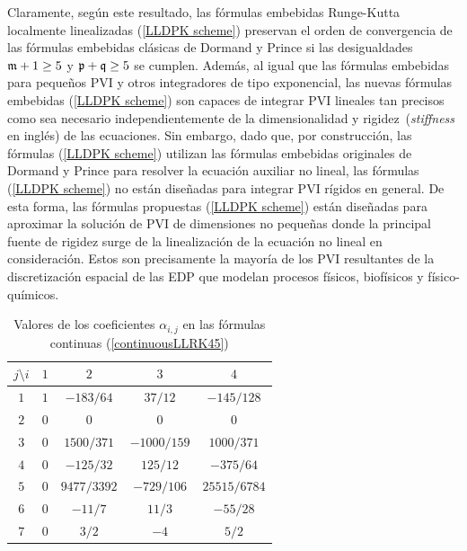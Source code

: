 Claramente, según este resultado, las fórmulas embebidas Runge-Kutta localmente linealizadas (\ref{LLDPK scheme}) preservan el orden de convergencia de las fórmulas embebidas clásicas de Dormand y Prince si las desigualdades $\mathfrak{m}+1 \ge 5 $ y $\mathfrak{p}+\mathfrak{q} \ge 5$ se cumplen. Además, al igual que las fórmulas embebidas para pequeños PVI y otros integradores de tipo exponencial, las nuevas fórmulas embebidas (\ref{LLDPK scheme}) son capaces de integrar PVI lineales tan precisos como sea necesario independientemente de la dimensionalidad y rigidez~(\textit{stiffness} en inglés) de las ecuaciones. Sin embargo, dado que, por construcción, las fórmulas (\ref{LLDPK scheme}) utilizan las fórmulas embebidas originales de Dormand y Prince para resolver la ecuación auxiliar no lineal, las fórmulas (\ref{LLDPK scheme}) no están diseñadas para integrar PVI rígidos en general. De esta forma, las fórmulas propuestas (\ref{LLDPK scheme}) están diseñadas para aproximar la solución de PVI de dimensiones no pequeñas donde la principal fuente de rigidez surge de la linealización de la ecuación no lineal en consideración. Estos son precisamente la mayoría de los PVI resultantes de la discretización espacial de las EDP que modelan procesos físicos, biofísicos y físico-químicos.
\begin{table}[htb]
	\caption{ Valores de los coeficientes $\alpha _{i,j}$ en las fórmulas continuas (\ref{continuousLLRK45})\label{Table continuous RK}}
	\centering
	\begin{tabular}{ccccc}
		\hline
		$j\setminus i$ & $1$ & $2$ & $3$ & $4$ \\
		\hline
		$1$ & $1$ & $-183/64$ & $37/12$ & $-145/128$ \\
		$2$ & $0$ & $0$ & $0$ & $0$ \\
		$3$ & $0$ & $1500/371$ & $-1000/159$ & $1000/371$ \\
		$4$ & $0$ & $-125/32$ & $125/12$ & $-375/64$ \\
		$5$ & $0$ &	$9477/3392$ & $-729/106$ & $25515/6784$ \\
		$6$ & $0$ &	$-11/7$ & $11/3$ & $-55/28$ \\
		$7$ & $0$ & $3/2$ & $-4$ & $5/2$ \\
		\hline
	\end{tabular}
\end{table}

